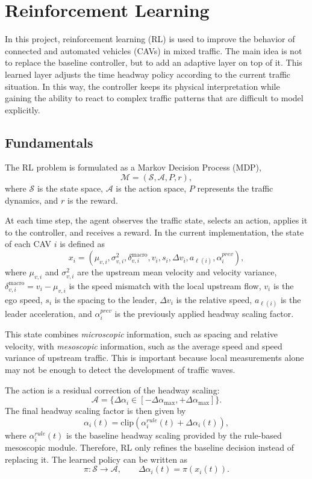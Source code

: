 \section{Reinforcement Learning}

In this project, reinforcement learning (RL) is used to improve the behavior of connected and automated vehicles (CAVs) in mixed traffic. The main idea is not to replace the baseline controller, but to add an adaptive layer on top of it. This learned layer adjusts the time headway policy according to the current traffic situation. In this way, the controller keeps its physical interpretation while gaining the ability to react to complex traffic patterns that are difficult to model explicitly.

\subsection{Fundamentals}

The RL problem is formulated as a Markov Decision Process (MDP),
\[
\mathcal{M} = (\mathcal{S}, \mathcal{A}, P, r),
\]
where $\mathcal{S}$ is the state space, $\mathcal{A}$ is the action space, $P$ represents the traffic dynamics, and $r$ is the reward.

At each time step, the agent observes the traffic state, selects an action, applies it to the controller, and receives a reward. In the current implementation, the state of each CAV $i$ is defined as
\[
x_i =
(\mu_{v,i}, \sigma_{v,i}^2, \delta^{\mathrm{macro}}_{v,i}, v_i, s_i, \Delta v_i, a_{\ell(i)}, \alpha_i^{prev}),
\]
where $\mu_{v,i}$ and $\sigma_{v,i}^2$ are the upstream mean velocity and velocity variance, $\delta^{\mathrm{macro}}_{v,i}=v_i-\mu_{v,i}$ is the speed mismatch with the local upstream flow, $v_i$ is the ego speed, $s_i$ is the spacing to the leader, $\Delta v_i$ is the relative speed, $a_{\ell(i)}$ is the leader acceleration, and $\alpha_i^{prev}$ is the previously applied headway scaling factor.

This state combines \emph{microscopic} information, such as spacing and relative velocity, with \emph{mesoscopic} information, such as the average speed and speed variance of upstream traffic. This is important because local measurements alone may not be enough to detect the development of traffic waves.

The action is a residual correction of the headway scaling:
\[
\mathcal{A} = \{\Delta\alpha_i \in [-\Delta\alpha_{\max}, +\Delta\alpha_{\max}]\}.
\]
The final headway scaling factor is then given by
\[
\alpha_i(t) =
\mathrm{clip}\left(\alpha_i^{rule}(t) + \Delta\alpha_i(t)\right),
\]
where $\alpha_i^{rule}(t)$ is the baseline headway scaling provided by the rule-based mesoscopic module. Therefore, RL only refines the baseline decision instead of replacing it. The learned policy can be written as
\[
\pi : \mathcal{S} \rightarrow \mathcal{A},
\qquad \Delta\alpha_i(t) = \pi(x_i(t)).
\]

